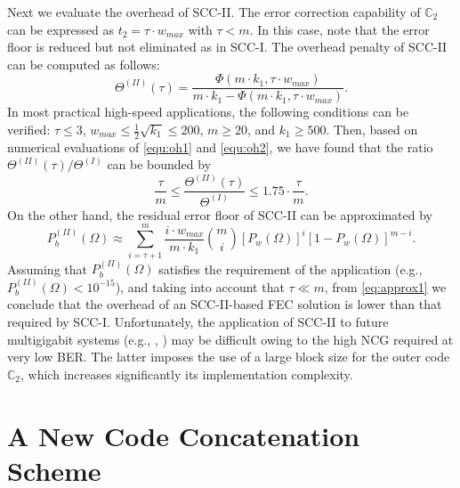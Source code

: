 \documentclass[conference]{IEEEtran}
\newcommand{\C}{\mathbb{C}}  %
\begin{document}
Next we evaluate the overhead of SCC-II. The error correction
capability of $\C_2$ can be expressed as $t_2=\tau \cdot w_{max}$ with
$\tau < m$. In this case, note that the error floor is reduced but not
eliminated as in SCC-I. The overhead penalty of SCC-II can be computed
as follows:
\begin{equation}
\label{equ:oh2}
 \Theta^{(I\!I)}(\tau) = \frac{\Phi(m\cdot k_1,\tau \cdot
   w_{max})}{m\cdot k_1-\Phi(m\cdot k_1,\tau \cdot w_{max})}.
\end{equation}
In most practical high-speed applications, the following conditions
can be verified: $\tau\leq 3$, $w_{max}\leq \frac{1}{2}\sqrt{k_1}\leq
200$, $m \geq 20$, and $k_1 \geq 500$. Then, based on numerical
evaluations of \eqref{equ:oh1} and \eqref{equ:oh2}, we have found that
the ratio $\Theta^{(I\!I)}(\tau)/\Theta^{(I)}$ can be bounded by
\begin{equation}\label{eq:approx1}
  \frac{\tau}{m} \leq \frac{\Theta^{(I\!I)}(\tau)}{\Theta^{(I)}} \leq 1.75\cdot \frac{\tau}{m}.
\end{equation}
On the other hand, the residual error floor of SCC-II can be
approximated by
\begin{equation}\label{equ:errorfloor1}
  P_b^{(I\!I)}(\Omega) \approx \sum_{i=\tau+1}^m \frac{i\cdot w_{max}}{m\cdot k_1}\binom{m}{i}[P_w(\Omega)]^i[1-P_w(\Omega)]^{m-i}.
\end{equation}
Assuming that $P_b^{(I\!I)}(\Omega)$ satisfies the requirement of the
application (e.g., $P_b^{(I\!I)}(\Omega)<10^{-15}$), and taking into
account that $\tau \ll m$, from \eqref{eq:approx1} we conclude that
the overhead of an SCC-II-based FEC solution is lower than that
required by SCC-I. Unfortunately, the application of SCC-II to future
multigigabit systems (e.g., \cite{OSKY2010}, \cite{VK2005}) may be
difficult owing to the high NCG required at very low BER. The latter
imposes the use of a large block size for the outer code $\C_2$, which
increases significantly its implementation complexity.

\section{A New Code Concatenation Scheme} \label{sec:proposed_scheme}
\end{document}
